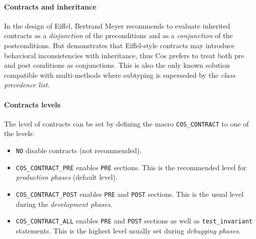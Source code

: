 \documentclass[preprint,10pt]{sigplanconf}
\newcommand{\ProgLang}[1]{{\sc #1}\xspace}
\newcommand{\Cos}       {\ProgLang{Cos}}
\newcommand{\Eiffel}    {\ProgLang{Eiffel}}
\newcommand{\code}[1]{\lstinline[language=COS,style=samplecode]|#1|}
\begin{document}
\paragraph{Contracts and inheritance}

In the design of \Eiffel, Ber\-trand Meyer recommends to evaluate inherited contracts as a {\em disjunction} of the preconditions and as a {\em conjunction} of the postconditions. But \cite{find01} demonstrates that \Eiffel-style contracts may introduce behavioral inconsistencies with inheritance, thus \Cos prefers to treat both pre and post conditions as conjunctions. This is also the only known solution compatible with multi-methods where subtyping is superseded by the {\em class precedence list}.

\paragraph{Contracts levels}

The level of contracts can be set by defining the macro \code{COS_CONTRACT} to one of the levels:
\begin{itemize}
\item \code{NO} disable contracts (not recommended).

\item \code{COS_CONTRACT_PRE} enables \code{PRE} sections. This is the recommended level for {\em production phases} (default level).

\item \code{COS_CONTRACT_POST} enables \code{PRE} and \code{POST} sections. This is the usual level during the {\em development phases}.

\item \code{COS_CONTRACT_ALL} enables \code{PRE} and \code{POST} sections as well as \code{test_invariant} statements. This is the highest level usually set during {\em debugging phases}.\end{itemize}
\end{document}
